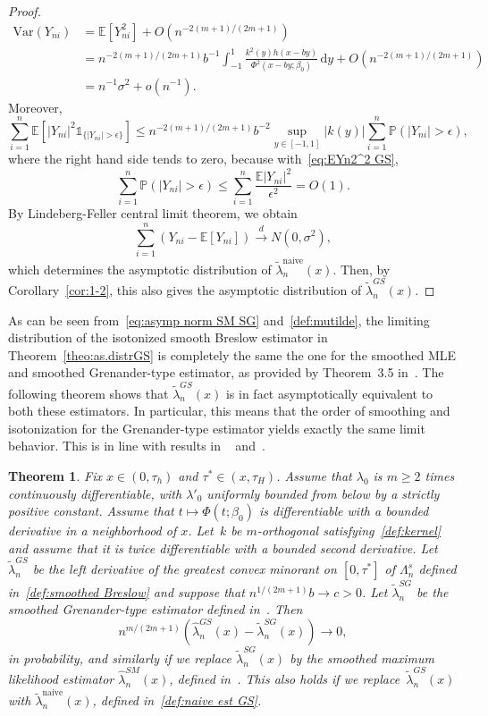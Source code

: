 \documentclass[11pt,reqno]{amsart}
\theoremstyle{definition}
\theoremstyle{plain}
\newtheorem{theo}[de]{Theorem}
\theoremstyle{remark}
\begin{document}
\begin{proof}
\begin{equation}
\begin{split}
\text{Var}(Y_{ni})
&=
{\mathbb{E}}\left[Y_{ni}^2\right]+O(n^{-2(m+1)/(2m+1)})\\
&=
n^{-2(m+1)/(2m+1)}b^{-1}
\int_{-1}^1 \frac{k^2(y)h(x-by)}{\Phi^2(x-by;\beta_0)}\,\mathrm{d}y
+
O\left(n^{-2(m+1)/(2m+1)}\right)\\
&=
n^{-1}\sigma^2+o(n^{-1}).
\end{split}
\end{equation}
Moreover,
\[
\sum_{i=1}^n
{\mathbb{E}}\left[|Y_{ni}|^2{\mathds{1}}_{\{|Y_{ni}|>\epsilon \}} \right]
\leq
n^{-2(m+1)/(2m+1)}b^{-2}
\sup_{y\in[-1,1]}|k(y)|
\sum_{i=1}^n{\mathbb{P}}\left(|Y_{ni}|>\epsilon\right),
\]
where the right hand side tends to zero, because with~\eqref{eq:EYn2^2 GS},
\[
\sum_{i=1}^n
{\mathbb{P}}\left(|Y_{ni}|>\epsilon\right)
\leq
\sum_{i=1}^n
\frac{{\mathbb{E}}|Y_{ni}|^2}{\epsilon^2}
=
O(1).
\]By Lindeberg-Feller central limit theorem, we obtain
\[
\sum_{i=1}^n \left(Y_{ni}-{\mathbb{E}}\left[Y_{ni}\right]\right)\xrightarrow{d}N(0,\sigma^2),
\]
which determines the asymptotic distribution of $\tilde{\lambda}_n^{\mathrm{naive}}(x)$.
Then, by Corollary~\ref{cor:1-2}, this also gives the asymptotic distribution of $\tilde{\lambda}^{GS}_n(x)$.
\end{proof}
As can be seen from~\eqref{eq:asymp norm SM SG} and~\eqref{def:mutilde}, the limiting distribution of the
isotonized smooth Breslow estimator in Theorem~\ref{theo:as.distrGS} is completely the same the one for the smoothed MLE and smoothed
Grenander-type estimator, as provided by Theorem~3.5 in~\cite{LopuhaaMustaSI2016}.
The following theorem shows that $\tilde{\lambda}_n^{GS}(x)$ is in fact asymptotically equivalent
to both these estimators.
In particular, this means that the order of smoothing and isotonization for the Grenander-type estimator
yields exactly the same limit behavior.
This is in line with results in ~\cite{mammen1991} and~\cite{vdvaart-vdlaan2003}.
\begin{theo}
Fix $x\in(0,\tau_h)$ and $\tau^*\in(x,\tau_H)$.
Assume that $\lambda_0$ is $m\geq2$ times continuously differentiable, with $\lambda'_0$ uniformly bounded from below by a strictly positive constant.
Assume that $t\mapsto \Phi(t;\beta_0)$ is differentiable with a bounded derivative in a neighborhood of $x$.
Let~$k$ be $m$-orthogonal satisfying~\eqref{def:kernel} and assume that it is twice differentiable with a bounded second derivative.
Let~$\tilde{\lambda}_n^{GS}$ be the left derivative of the greatest convex minorant on $[0,\tau^*]$ of $\Lambda_n^s$ defined in~\eqref{def:smoothed Breslow}
and suppose that $n^{1/(2m+1)}b\to c>0$.
Let $\tilde\lambda_n^{SG}$ be the smoothed Grenander-type estimator defined in~\cite{LopuhaaMustaSI2016}.
Then
\[
n^{m/(2m+1)}
\left(
\hat\lambda_n^{GS}(x)-\tilde\lambda_n^{SG}(x)
\right)
\to 0,
\]
in probability, and similarly if we replace $\tilde\lambda_n^{SG}(x)$
by the smoothed maximum likelihood estimator $\hat\lambda_n^{SM}(x)$, defined in~\cite{LopuhaaMustaSI2016}.
This also holds if we replace~$\tilde{\lambda}^{GS}_n(x)$ with $\tilde{\lambda}_n^{\mathrm{naive}}(x)$, defined in~\eqref{def:naive est GS}.
\end{theo}
\end{document}
